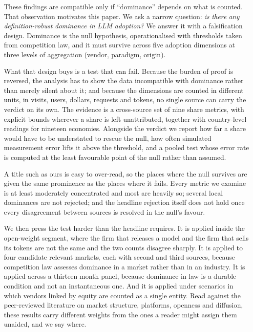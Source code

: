 \documentclass[11pt]{article}
\begin{document}
These findings are compatible only if ``dominance'' depends on what is counted. That observation motivates this paper. We ask a narrow question: \emph{is there any definition-robust dominance in LLM adoption?} We answer it with a falsification design. Dominance is the null hypothesis, operationalised with thresholds taken from competition law, and it must survive across five adoption dimensions at three levels of aggregation (vendor, paradigm, origin).

What that design buys is a test that can fail. Because the burden of proof is reversed, the analysis has to show the data incompatible with dominance rather than merely silent about it; and because the dimensions are counted in different units, in visits, users, dollars, requests and tokens, no single source can carry the verdict on its own. The evidence is a cross-source set of nine share metrics, with explicit bounds wherever a share is left unattributed, together with country-level readings for nineteen economies. Alongside the verdict we report how far a share would have to be understated to rescue the null, how often simulated measurement error lifts it above the threshold, and a pooled test whose error rate is computed at the least favourable point of the null rather than assumed.

A title such as ours is easy to over-read, so the places where the null survives are given the same prominence as the places where it fails. Every metric we examine is at least moderately concentrated and most are heavily so; several local dominances are not rejected; and the headline rejection itself does not hold once every disagreement between sources is resolved in the null's favour.

We then press the test harder than the headline requires. It is applied inside the open-weight segment, where the firm that releases a model and the firm that sells its tokens are not the same and the two counts disagree sharply. It is applied to four candidate relevant markets, each with second and third sources, because competition law assesses dominance in a market rather than in an industry. It is applied across a thirteen-month panel, because dominance in law is a durable condition and not an instantaneous one. And it is applied under scenarios in which vendors linked by equity are counted as a single entity. Read against the peer-reviewed literature on market structure, platforms, openness and diffusion, these results carry different weights from the ones a reader might assign them unaided, and we say where.
\end{document}
